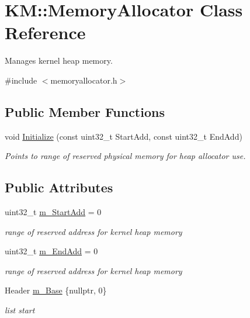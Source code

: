 \hypertarget{class_k_m_1_1_memory_allocator}{}\section{KM\+:\+:Memory\+Allocator Class Reference}
\label{class_k_m_1_1_memory_allocator}


Manages kernel heap memory.  




{\ttfamily \#include $<$memoryallocator.\+h$>$}

\subsection*{Public Member Functions}
\begin{DoxyCompactItemize}
\item 
void \hyperlink{class_k_m_1_1_memory_allocator_acf0f1026d4b06044f1e4f21735ce6e5a}{Initialize} (const uint32\+\_\+t Start\+Add, const uint32\+\_\+t End\+Add)
\begin{DoxyCompactList}\small\item\em Points to range of reserved physical memory for heap allocator use. \end{DoxyCompactList}\end{DoxyCompactItemize}
\subsection*{Public Attributes}
\begin{DoxyCompactItemize}
\item 
uint32\+\_\+t \hyperlink{class_k_m_1_1_memory_allocator_a7c20d888ecece0f856a4300f3134a5b8}{m\+\_\+\+Start\+Add} = 0
\begin{DoxyCompactList}\small\item\em range of reserved address for kernel heap memory \end{DoxyCompactList}\item 
uint32\+\_\+t \hyperlink{class_k_m_1_1_memory_allocator_aebd2cb25d4536312f915b1d65d724934}{m\+\_\+\+End\+Add} = 0
\begin{DoxyCompactList}\small\item\em range of reserved address for kernel heap memory \end{DoxyCompactList}\item 
Header \hyperlink{class_k_m_1_1_memory_allocator_aa69b432479e7d67731ff420ce9b904a4}{m\+\_\+\+Base} \{nullptr, 0\}
\begin{DoxyCompactList}\small\item\em list start \end{DoxyCompactList}\end{DoxyCompactItemize}


